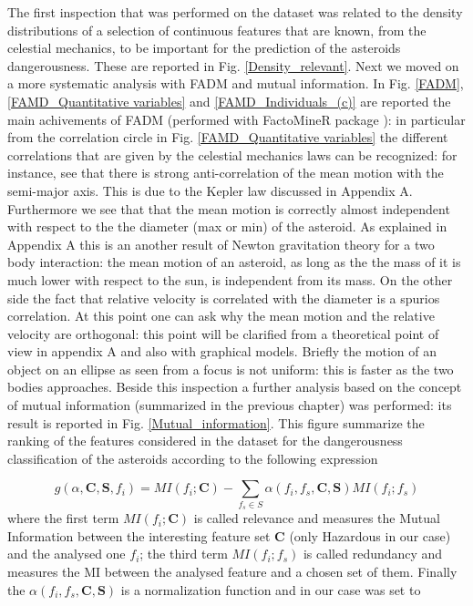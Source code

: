 \documentclass[12pt,%
               a4paper,%
               oneside,openany,%
               titlepage,%
               headinclude,footinclude,%
               BCOR5mm,%
               cleardoublepage=empty,%
               tablecaptionabove,%
               floatperchapter,
               ]{scrreprt}                 %
\begin{document}
The first inspection that was performed on the dataset was related to the density distributions of a selection of continuous features that are known, from the celestial mechanics, to be important for the prediction of the asteroids dangerousness. These are reported in Fig. \ref{Density_relevant}. Next we moved on a more systematic analysis with FADM and mutual information. In Fig. \ref{FADM},\ref{FAMD_Quantitative variables} and \ref{FAMD_Individuals_(c)} are reported the main achivements of FADM (performed with FactoMineR package \cite{le2008factominer}): in particular from the correlation circle in Fig. \ref{FAMD_Quantitative variables} the different correlations that are given by the celestial mechanics laws can be recognized: for instance, see that there is strong anti-correlation of the mean motion with the semi-major axis. This is due to the Kepler law discussed in Appendix A. Furthermore we see that that the mean motion is correctly almost independent with respect to the the diameter (max or min) of  the asteroid. As explained in Appendix A this is an another result of Newton gravitation theory for a two body interaction: the mean motion of an asteroid, as long as the the mass of it is much lower with respect to the sun, is independent from its mass. On the other side the fact that relative velocity is correlated with the diameter is a spurios correlation. At this point one can ask why the mean motion and the relative velocity are orthogonal: this point will be clarified from a theoretical point of view in appendix A and also with graphical models. Briefly the motion of an object on an ellipse as seen from a focus is not uniform: this is faster as the two bodies approaches. Beside this inspection a further analysis based on the concept of mutual information (summarized in the previous chapter) was performed: its result is reported in Fig. \ref{Mutual_information}. This figure summarize the ranking of the features considered in the dataset for the dangerousness classification of the asteroids according to the following expression \cite{kratzer2018varrank}

\begin{equation}
g(\alpha,\textbf{C},\textbf{S},f_{i})=MI(f_{i};\textbf{C})-\sum_{f_{s}\in S}\alpha(f_{i},f_{s},\textbf{C},\textbf{S})MI(f_{i};f_{s})
\end{equation}
where the first term $MI(f_{i};\textbf{C})$ is called relevance and measures the Mutual Information between the interesting feature set $\textbf{C}$ (only Hazardous in our case) and the analysed one $f_{i}$; the third term $MI(f_{i};f_{s})$ is called redundancy and measures the MI between the analysed feature and a chosen set of them. Finally the $\alpha(f_{i},f_{s},\textbf{C},\textbf{S})$ is a normalization function and in our case was set to \cite{kratzer2018varrank}
\end{document}
